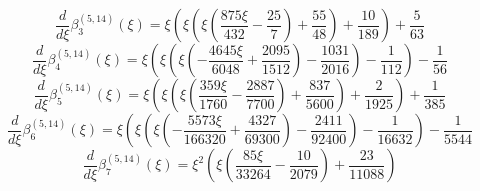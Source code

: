 \begin{equation}
\frac{d}{d\xi}\beta_{3}^{(5,14)} (\xi) =
 \xi \left(\xi \left(\xi \left(\frac{875 \xi}{432}
 - \frac{25}{7}\right) + \frac{55}{48}\right) + \frac{10}{189}\right) + \frac{5}{63}
\end{equation}
\begin{equation}
\frac{d}{d\xi}\beta_{4}^{(5,14)} (\xi) =
 \xi \left(\xi \left(\xi \left(- \frac{4645 \xi}{6048}
 + \frac{2095}{1512}\right) - \frac{1031}{2016}\right) - \frac{1}{112}\right) - \frac{1}{56}
\end{equation}
\begin{equation}
\frac{d}{d\xi}\beta_{5}^{(5,14)} (\xi) =
 \xi \left(\xi \left(\xi \left(\frac{359 \xi}{1760}
 - \frac{2887}{7700}\right) + \frac{837}{5600}\right) + \frac{2}{1925}\right) + \frac{1}{385}
\end{equation}
\begin{equation}
\frac{d}{d\xi}\beta_{6}^{(5,14)} (\xi) =
 \xi \left(\xi \left(\xi \left(- \frac{5573 \xi}{166320}
 + \frac{4327}{69300}\right) - \frac{2411}{92400}\right) - \frac{1}{16632}\right) - \frac{1}{5544}
\end{equation}
\begin{equation}
\frac{d}{d\xi}\beta_{7}^{(5,14)} (\xi) =
 \xi^{2} \left(\xi \left(\frac{85 \xi}{33264} - \frac{10}{2079}\right) + \frac{23}{11088}\right)
\end{equation}
